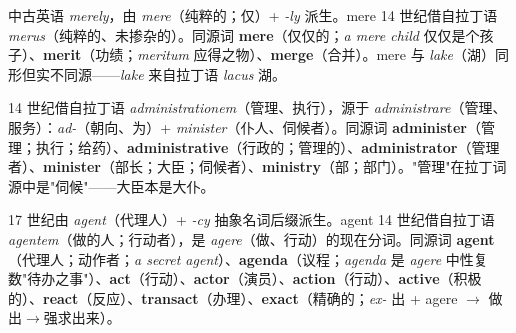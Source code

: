 \documentclass[../main.tex]{subfiles}
\begin{document}
\begin{origin}
中古英语 \textit{merely}，由 \textit{mere}（纯粹的；仅）+ \textit{-ly} 派生。mere 14 世纪借自拉丁语 \textit{merus}（纯粹的、未掺杂的）。同源词 \textbf{mere}（仅仅的；\textit{a mere child} 仅仅是个孩子）、\textbf{merit}（功绩；\textit{meritum} 应得之物）、\textbf{merge}（合并）。mere 与 \textit{lake}（湖）同形但实不同源——\textit{lake} 来自拉丁语 \textit{lacus} 湖。
\end{origin}




\begin{origin}
14 世纪借自拉丁语 \textit{administrationem}（管理、执行），源于 \textit{administrare}（管理、服务）：\textit{ad-}（朝向、为）+ \textit{minister}（仆人、伺候者）。同源词 \textbf{administer}（管理；执行；给药）、\textbf{administrative}（行政的；管理的）、\textbf{administrator}（管理者）、\textbf{minister}（部长；大臣；伺候者）、\textbf{ministry}（部；部门）。"管理"在拉丁词源中是"伺候"——大臣本是大仆。
\end{origin}




\begin{origin}
17 世纪由 \textit{agent}（代理人）+ \textit{-cy} 抽象名词后缀派生。agent 14 世纪借自拉丁语 \textit{agentem}（做的人；行动者），是 \textit{agere}（做、行动）的现在分词。同源词 \textbf{agent}（代理人；动作者；\textit{a secret agent}）、\textbf{agenda}（议程；\textit{agenda} 是 \textit{agere} 中性复数"待办之事"）、\textbf{act}（行动）、\textbf{actor}（演员）、\textbf{action}（行动）、\textbf{active}（积极的）、\textbf{react}（反应）、\textbf{transact}（办理）、\textbf{exact}（精确的；\textit{ex-} 出 + agere $\to$ 做出$\to$强求出来）。
\end{origin}
\end{document}
